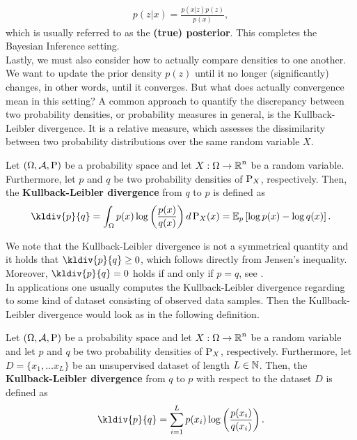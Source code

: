 \begin{align}\label{eq:posterior}
p(z|x) = \frac{p(x|z)p(z)}{p(x)},
\end{align}
which is usually referred to as the \textbf{(true) posterior}. This completes the Bayesian Inference setting.\\
Lastly, we must also consider how to actually compare densities to one another. We want to update the prior density $p(z)$ until it \glqq no longer (significantly) changes\grqq{}, in other words, until it converges. But what does actually convergence mean in this setting? A common approach to quantify the discrepancy between two probability densities, or probability measures in general, is the Kullback-Leibler divergence. It is a relative measure, which assesses the dissimilarity between two probability distributions over the same random variable $X$.

\begin{definition}\label{def:KL_div}
Let $(\Omega,\operatorname{\mathcal{A}}, \operatorname{\text{P}})$ be a probability space and let $X:\Omega \to \operatorname{\mathbb{R}}^n$ be a random variable. Furthermore, let $p$ and $q$ be two probability densities of $\operatorname{\text{P}}_X$, respectively. Then, the \textbf{Kullback-Leibler divergence} from $q$ to $p$ is defined as
\begin{align}
\kldiv{p}{q} = \int_\O p(x) \log \left( \frac{p(x)}{q(x)}\right) d\prob_X(x) = \E_p \left[\log p(x) - \log q(x) \right].
\end{align}
\end{definition}

We note that the Kullback-Leibler divergence is not a symmetrical quantity and it holds that $\kldiv{p}{q}\geq 0$, which follows directly from Jensen's inequality. Moreover, $\kldiv{p}{q} = 0$ holds if and only if $p = q$, see \cite[Section~23.3]{klenke2013probability}.\\
In applications one usually computes the Kullback-Leibler divergence regarding to some kind of dataset consisting of observed data samples. Then the Kullback-Leibler divergence would look as in the following definition.

\begin{definition}\label{def:KL_div_data}
Let $(\Omega,\operatorname{\mathcal{A}}, \operatorname{\text{P}})$ be a probability space and let $X:\Omega \to \operatorname{\mathbb{R}}^n$ be a random variable and let $p$ and $q$ be two probability densities of $\operatorname{\text{P}}_X$, respectively. Furthermore, let $D=\{x_1, \ldots x_L\}$ be an unsupervised dataset of length $L\in\operatorname{\mathbb{N}}$. Then, the \textbf{Kullback-Leibler divergence} from $q$ to $p$ with respect to the dataset $D$ is defined as
\begin{align}
\kldiv{p}{q} = \sum_{i=1}^L p(x_i) \log \left( \frac{p(x_i)}{q(x_i)}\right).
\end{align}
\end{definition}

